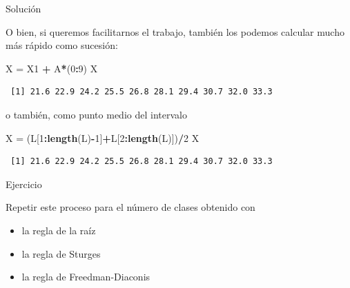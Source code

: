 \documentclass[
  ignorenonframetext,
]{beamer}
\newenvironment{Shaded}{\begin{snugshade}}{\end{snugshade}}
\newcommand{\DecValTok}[1]{\textcolor[rgb]{0.00,0.00,0.81}{#1}}
\newcommand{\KeywordTok}[1]{\textcolor[rgb]{0.13,0.29,0.53}{\textbf{#1}}}
\newcommand{\NormalTok}[1]{#1}
\newcommand{\OperatorTok}[1]{\textcolor[rgb]{0.81,0.36,0.00}{\textbf{#1}}}
\newcommand{\StringTok}[1]{\textcolor[rgb]{0.31,0.60,0.02}{#1}}
\providecommand{\tightlist}{%
  \setlength{\itemsep}{0pt}\setlength{\parskip}{0pt}}
\begin{document}
\begin{frame}[fragile]{Solución}
\protect\hypertarget{soluciuxf3n-10}{}

O bien, si queremos facilitarnos el trabajo, también los podemos
calcular mucho más rápido como sucesión:

\begin{Shaded}
\begin{Highlighting}[]
\NormalTok{X =}\StringTok{ }\NormalTok{X1 }\OperatorTok{+}\StringTok{ }\NormalTok{A}\OperatorTok{*}\NormalTok{(}\DecValTok{0}\OperatorTok{:}\DecValTok{9}\NormalTok{)}
\NormalTok{X}
\end{Highlighting}
\end{Shaded}

\begin{verbatim}
 [1] 21.6 22.9 24.2 25.5 26.8 28.1 29.4 30.7 32.0 33.3
\end{verbatim}

o también, como punto medio del intervalo

\begin{Shaded}
\begin{Highlighting}[]
\NormalTok{X =}\StringTok{ }\NormalTok{(L[}\DecValTok{1}\OperatorTok{:}\KeywordTok{length}\NormalTok{(L)}\OperatorTok{-}\DecValTok{1}\NormalTok{]}\OperatorTok{+}\NormalTok{L[}\DecValTok{2}\OperatorTok{:}\KeywordTok{length}\NormalTok{(L)])}\OperatorTok{/}\DecValTok{2}
\NormalTok{X}
\end{Highlighting}
\end{Shaded}

\begin{verbatim}
 [1] 21.6 22.9 24.2 25.5 26.8 28.1 29.4 30.7 32.0 33.3
\end{verbatim}

\end{frame}

\begin{frame}{Ejercicio}
\protect\hypertarget{ejercicio}{}

Repetir este proceso para el número de clases obtenido con

\begin{itemize}
\tightlist
\item
  la regla de la raíz
\item
  la regla de Sturges
\item
  la regla de Freedman-Diaconis
\end{itemize}

\end{frame}
\end{document}
